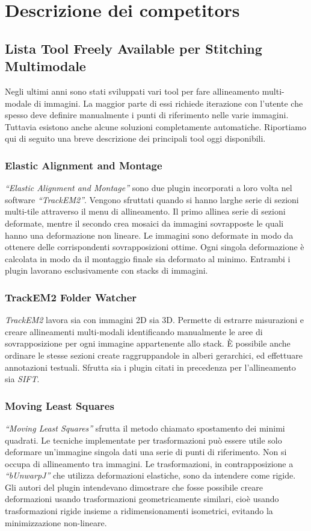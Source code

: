 \chapter{Descrizione dei competitors}
\label{chap:competitors}

\section{Lista Tool Freely Available per Stitching Multimodale}
\frenchspacing
Negli ultimi anni sono stati sviluppati vari tool per fare allineamento multi-modale di immagini. La maggior parte di essi richiede iterazione con l’utente che spesso deve definire manualmente i punti di riferimento nelle varie immagini. Tuttavia esistono anche alcune soluzioni completamente automatiche. Riportiamo qui di seguito una breve descrizione dei principali tool oggi disponibili.

\subsection{Elastic Alignment and Montage}
\textit{``Elastic Alignment and Montage''} sono due plugin incorporati a loro volta nel software \textit{``TrackEM2''}. Vengono sfruttati quando si hanno larghe serie di sezioni multi-tile attraverso il menu di allineamento. Il primo allinea serie di sezioni deformate, mentre il secondo crea mosaici da immagini sovrapposte le quali hanno una deformazione non lineare. Le immagini sono deformate in modo da ottenere delle corrispondenti sovrapposizioni ottime. Ogni singola deformazione è calcolata in modo da il montaggio finale sia deformato al minimo. Entrambi i plugin lavorano esclusivamente con stacks di immagini.

\subsection{TrackEM2 Folder Watcher}
\textit{TrackEM2} lavora sia con immagini 2D sia 3D. Permette di estrarre misurazioni e creare allineamenti multi-modali identificando manualmente le aree di sovrapposizione per ogni immagine appartenente allo stack. È possibile anche ordinare le stesse sezioni create raggruppandole in alberi gerarchici, ed effettuare annotazioni testuali.
Sfrutta sia i plugin citati in precedenza per l'allineamento sia \textit{SIFT}.

\subsection{Moving Least Squares}
\textit{``Moving Least Squares''} sfrutta il metodo chiamato spostamento dei minimi quadrati. Le tecniche implementate per trasformazioni può essere utile solo deformare un'immagine singola dati una serie di punti di riferimento. Non si occupa di allineamento tra immagini. Le trasformazioni, in contrapposizione a \textit{``bUnwarpJ''} che utilizza deformazioni elastiche, sono da intendere come rigide. Gli autori del plugin intendevano dimostrare che fosse possibile creare deformazioni usando trasformazioni geometricamente similari, cioè usando trasformazioni rigide insieme a ridimensionamenti isometrici, evitando la minimizzazione non-lineare.


